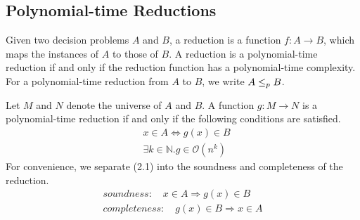 \subsection*{Polynomial-time Reductions}
\begin{definition}
    Given two decision problems $A$ and $B$, 
a reduction is a function $f: A \rightarrow B$, 
which maps the instances of $A$ to those of $B$. A reduction is a polynomial-time reduction
if and only if the reduction function has a polynomial-time complexity. 
For a polynomial-time reduction from $A$ to $B$, we write $A \leq_p B$. 
\end{definition}
Let $M$ and $N$ denote the universe of $A$ and $B$. 
A function $g: M \rightarrow N$ is a polynomial-time reduction 
if and only if the following conditions are satisfied.
\begin{align*}  
    &x \in A \iff g(x) \in B \\
    &\exists k\in \mathbb{N}. g \in \mathcal{O}(n^k)
\end{align*}
For convenience, we separate (2.1) into the soundness and completeness of the reduction.
\begin{align*}
    soundness: \quad x \in A \Longrightarrow g(x) \in B \\
    completeness: \quad g(x) \in B \Longrightarrow x \in A
\end{align*}

